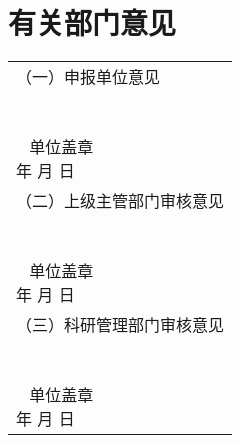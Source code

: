 \section{有关部门意见}
\vspace*{-18mm}
\def\arraystretch{7.0}
{\kai
\begin{tabular}{p{16.1cm}}
\makecell[l]{（一）申报单位意见 \\
	\\
	\\
	\quad\quad\quad\quad\quad\quad\quad\quad\quad\quad\quad\quad\quad\quad\quad\quad\quad\quad\quad\quad\quad\quad\quad\quad\quad\quad\quad\quad\quad~ 单位盖章 \\
	\quad\quad\quad\quad\quad\quad\quad\quad\quad\quad\quad\quad\quad\quad\quad\quad\quad\quad\quad\quad\quad\quad\quad\quad\quad\quad\quad\quad\quad  年   \quad 月  \quad  日 \\
} \\ 

\makecell[l]{（二）上级主管部门审核意见 \\
	\\
	\\
	\quad\quad\quad\quad\quad\quad\quad\quad\quad\quad\quad\quad\quad\quad\quad\quad\quad\quad\quad\quad\quad\quad\quad\quad\quad\quad\quad\quad\quad~ 单位盖章 \\
	\quad\quad\quad\quad\quad\quad\quad\quad\quad\quad\quad\quad\quad\quad\quad\quad\quad\quad\quad\quad\quad\quad\quad\quad\quad\quad\quad\quad\quad  年   \quad 月  \quad  日 \\
} \\ 
\makecell[l]{（三）科研管理部门审核意见 \\
	\\
	\\
	\quad\quad\quad\quad\quad\quad\quad\quad\quad\quad\quad\quad\quad\quad\quad\quad\quad\quad\quad\quad\quad\quad\quad\quad\quad\quad\quad\quad\quad~ 单位盖章 \\
	\quad\quad\quad\quad\quad\quad\quad\quad\quad\quad\quad\quad\quad\quad\quad\quad\quad\quad\quad\quad\quad\quad\quad\quad\quad\quad\quad\quad\quad  年   \quad 月  \quad  日 \\
} \\ 
\end{tabular}
}

